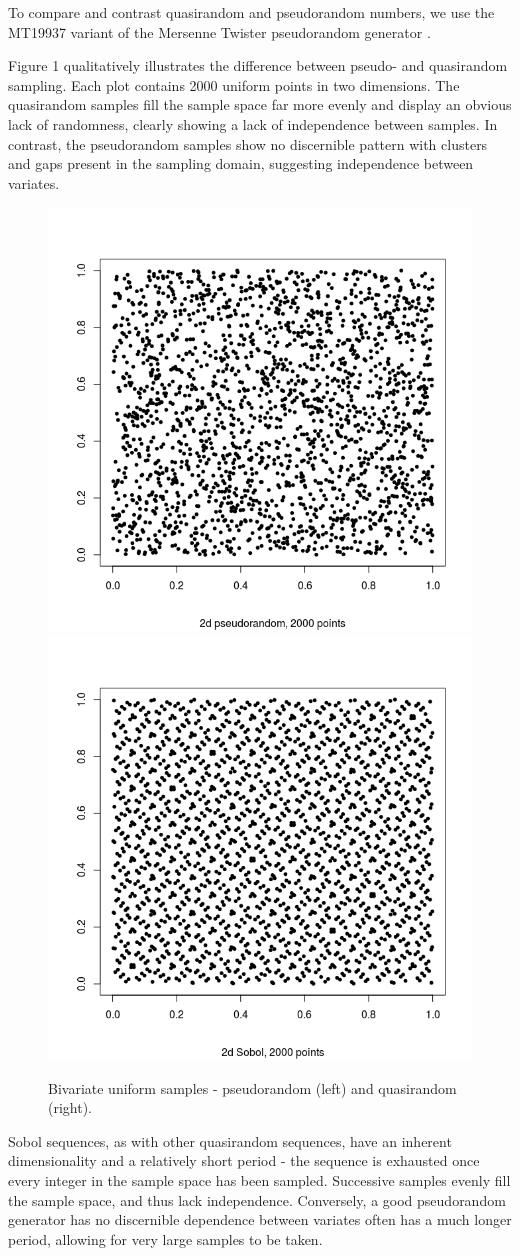 \documentclass{JASSS}
\begin{document}
To compare and contrast quasirandom and pseudorandom numbers, we use the MT19937 variant of the Mersenne Twister pseudorandom generator \citep{matsumoto_mersenne_1998}.

Figure 1 qualitatively illustrates the difference between pseudo- and
quasirandom sampling. Each plot contains 2000 uniform points in two
dimensions. The quasirandom samples fill the sample space far more
evenly and display an obvious lack of randomness, clearly showing a lack
of independence between samples. In contrast, the pseudorandom samples
show no discernible pattern with clusters and gaps present in the
sampling domain, suggesting independence between variates.

\begin{figure}[!t]
\includegraphics[width=0.5\linewidth]{figures/pseudo2d} 
\includegraphics[width=0.5\linewidth]{figures/quasi2d} 
\caption{Bivariate uniform samples -  pseudorandom (left) and quasirandom (right).}
\label{fig:unnamed-chunk-1}
\end{figure}

Sobol sequences, as with other quasirandom sequences, have an inherent
dimensionality and a relatively short period - the sequence is exhausted
once every integer in the sample space has been sampled. Successive
samples evenly fill the sample space, and thus lack independence.
Conversely, a good pseudorandom generator has no discernible dependence
between variates often has a much longer period, allowing for very large
samples to be taken.
\end{document}
